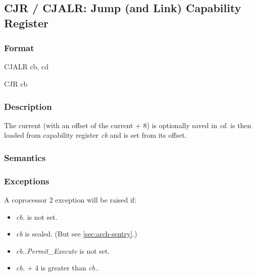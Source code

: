 \clearpage
{}
{}
\subsection*{CJR / CJALR: Jump (and Link) Capability Register}

\subsubsection*{Format}

CJALR cb, cd

\begin{center}
\end{center}

{}

CJR cb

\begin{center}
\end{center}

\subsubsection*{Description}

The current \PCC{} (with an offset of the current \PC{} $+$ 8) is
optionally saved in \textit{cd}.
\PCC{} is then loaded from capability register \textit{cb} and \PC{}
is set from its offset.

\subsubsection*{Semantics}

\subsubsection*{Exceptions}

A coprocessor 2 exception will be raised if:

\begin{itemize}
\item
\emph{cb.\ctag{}} is not set.
\item
\emph{cb} is sealed. (But see \cref{sec:arch-sentry}.)
\item
\textit{cb.\cperms.Permit\_Execute} is not set.
\item
\textit{cb.\coffset{}} + 4 is greater than \textit{cb.\clength{}}.
\end{itemize}

